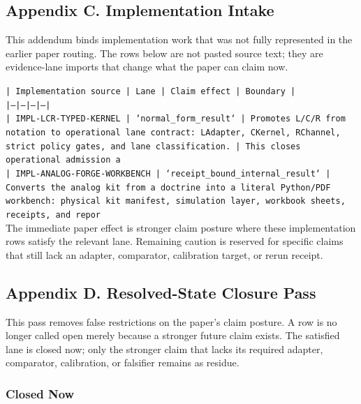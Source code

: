 \documentclass[11pt]{article}
\begin{document}
\subsection*{Appendix C. Implementation Intake}

This addendum binds implementation work that was not fully represented in the earlier paper routing. The rows below are not pasted source text; they are evidence-lane imports that change what the paper can claim now.

\noindent\texttt{| Implementation source | Lane | Claim effect | Boundary |}\\
\noindent\texttt{|---|---|---|---|}\\
\noindent\texttt{| IMPL-LCR-TYPED-KERNEL | `normal\_form\_result` | Promotes L/C/R from notation to operational lane contract: LAdapter, CKernel, RChannel, strict policy gates, and lane classification. | This closes operational admission a}\\
\noindent\texttt{| IMPL-ANALOG-FORGE-WORKBENCH | `receipt\_bound\_internal\_result` | Converts the analog kit from a doctrine into a literal Python/PDF workbench: physical kit manifest, simulation layer, workbook sheets, receipts, and repor}\\

The immediate paper effect is stronger claim posture where these implementation rows satisfy the relevant lane. Remaining caution is reserved for specific claims that still lack an adapter, comparator, calibration target, or rerun receipt.

\subsection*{Appendix D. Resolved-State Closure Pass}

This pass removes false restrictions on the paper's claim posture. A row is no longer called open merely because a stronger future claim exists. The satisfied lane is closed now; only the stronger claim that lacks its required adapter, comparator, calibration, or falsifier remains as residue.

\subsubsection*{Closed Now}
\end{document}

